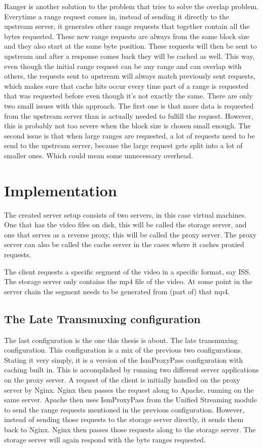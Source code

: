 \documentclass[twoside,openright]{uva-bachelor-thesis}
\begin{document}
Ranger\autocite{ranger} is another solution to the problem that tries to solve
the overlap problem. Everytime a range request comes in, instead of sending it
directly to the upstream server, it generates other range requests that together
contain all the bytes requested. These new range requests are always from the
same block size and they also start at the same byte position. These requests
will then be sent to upstream and after a response comes back they will be
cached as well.  This way, even though the initial range request can be any
range and can overlap with others, the requests sent to upstream will always
match previously sent requests, which makes sure that cache hits occur every
time part of a range is requested that was requested before even though it's not
exactly the same. There are only two small issues with this approach. The first
one is that more data is requested from the upstream server than is actually
needed to fulfill the request. However, this is probably not too severe when the
block size is chosen small enough. The second issue is that when large ranges
are requested, a lot of requests need to be send to the upstream server, because
the large request gets split into a lot of smaller ones. Which could mean some
unnecessary overhead.





\chapter{Implementation}
The created server setup consists of two servers, in this case virtual machines.
One that has the video files on disk, this will be called the storage server,
and one that serves as a reverse proxy, this will be called the proxy server.
The proxy server can also be called the cache server in the cases where it
caches proxied requests.

The client requests a specific segment of the video in a specific format, say
ISS. The storage server only contains the mp4 file of the video. At some point
in the server chain the segment needs to be generated from (part of) that mp4.



\section{The Late Transmuxing configuration}
The last configuration is the one this thesis is about. The late transmuxing
configuration. This configuration is a mix of the previous two configurations.
Stating it very simply, it is a version of the IsmProxyPass configuration with
caching built in. This is accomplished by running two different server
applications on the proxy server. A request of the client is initially handled
on the proxy server by Nginx. Nginx then passes the request along to Apache,
running on the same server. Apache then uses IsmProxyPass from the Unified
Streaming module to send the range requests mentioned in the previous
configuration.  However, instead of sending those requests to the storage server
directly, it sends them back to Nginx. Nginx then passes those requests along to
the storage server. The storage server will again respond with the byte ranges
requested.
\end{document}
